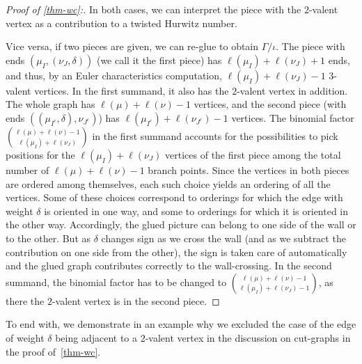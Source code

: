 \begin{proof}[Proof of \cref{thm-wc}:]
In both cases, we can interpret the piece with the $2$-valent vertex as a contribution to a twisted Hurwitz number.

Vice versa, if two pieces are given, we can re-glue to obtain $\Gamma/\iota$. 
The piece with ends $(\mu_I,(\nu_J,\delta))$ (we call it the first piece) has $\ell(\mu_I)+\ell(\nu_J)+1$ ends, and thus, by an Euler characteristics computation, $\ell(\mu_I)+\ell(\nu_J)-1$ $3$-valent vertices. In the first summand, it also has the $2$-valent vertex in addition.
The whole graph has $\ell(\mu)+\ell(\nu)-1$ vertices, and the second piece (with ends  $((\mu_{I^c},\delta),\nu_{J^c})$)
has $\ell(\mu_{I^c})+\ell(\nu_{J^c})-1$ vertices. 
The binomial factor $\binom{\ell(\mu)+\ell(\nu)-1}{\ell(\mu_I)+\ell(\nu_J)}$ in the first summand accounts for the possibilities to pick positions for the $\ell(\mu_I)+\ell(\nu_J)$ vertices of the first piece among the total number of $\ell(\mu)+\ell(\nu)-1$ branch points. Since the vertices in both pieces are ordered among themselves, each such choice yields an ordering of all the vertices. Some of these choices correspond to orderings for which the edge with weight $\delta$ is oriented in one way, and some to orderings for which it is oriented in the other way. Accordingly, the glued picture can belong to one side of the wall or to the other. But as $\delta$ changes sign as we cross the wall (and as we subtract the contribution on one side from the other), the sign is taken care of automatically and the glued graph contributes correctly to the wall-crossing.
In the second summand, the binomial factor has to be changed to $\binom{\ell(\mu)+\ell(\nu)-1}{\ell(\mu_I)+\ell(\nu_J)-1}$, as there the $2$-valent vertex is in the second piece.
\end{proof}

To end with, we demonstrate in an example why we excluded the case of the edge of weight $\delta$ being adjacent to a $2$-valent vertex in the discussion on cut-graphs in the proof of~\cref{thm-wc}.

